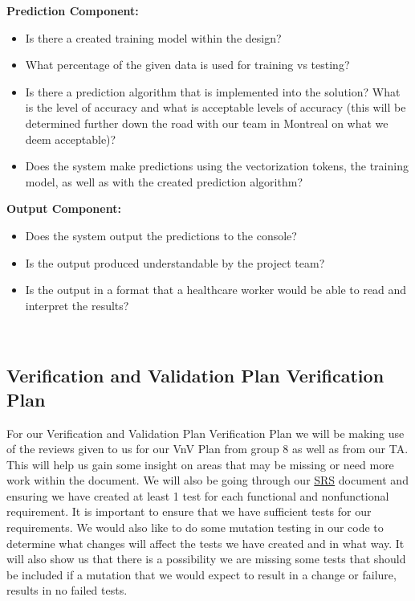 \documentclass[12pt, titlepage]{article}
\begin{document}
  \noindent \textbf{Prediction Component:}
  \begin{itemize}
  \item Is there a created training model within the design?
  \item What percentage of the given data is used for training vs testing?
  \item Is there a prediction algorithm that is implemented into the solution? What is the level of accuracy and what is acceptable levels of accuracy (this will be determined further down the road with our team in Montreal on what we deem acceptable)?
  \item Does the system make predictions using the vectorization tokens, the training model, as well as with the created prediction algorithm?\\
  \end{itemize}
  
  
  \noindent \textbf{Output Component:}
  \begin{itemize}
  \item Does the system output the predictions to the console?
  \item Is the output produced understandable by the project team?
  \item Is the output in a format that a healthcare worker would be able to read and interpret the results?
  \end{itemize}
  \\
  
  
  \subsection{Verification and Validation Plan Verification Plan}\label{Verification and Validation Plan Verification Plan}
  
  For our Verification and Validation Plan Verification Plan we will be making use of the reviews given to us for our VnV Plan from group 8 as well as from our TA. This will help us gain some insight on areas that may be missing or need more work within the document. We will also be going through our \href{https://github.com/MichaelBreau/nlp-mentalhealth/blob/main/docs/SRS/index.pdf}{SRS} document and ensuring we have created at least 1 test for each functional and nonfunctional requirement. It is important to ensure that we have sufficient tests for our requirements. We would also like to do some mutation testing in our code to determine what changes will affect the tests we have created and in what way. It will also show us that there is a possibility we are missing some tests that should be included if a mutation that we would expect to result in a change or failure, results in no failed tests.\\ 
\end{document}
